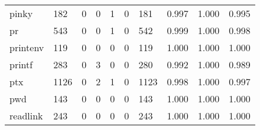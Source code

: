 \begin{longtable}{lp{1.3cm}p{1.3cm}p{1.3cm}p{1.3cm}p{1.3cm}p{1.3cm}p{1.3cm}p{1.3cm}p{1.3cm}}
pinky     &                    182 &                                  0 &                                 0 &                                1 &                                 0 &                             181 &                                   0.997 &                                  1.000 &                                0.995 \\
pr        &                    543 &                                  0 &                                 0 &                                1 &                                 0 &                             542 &                                   0.999 &                                  1.000 &                                0.998 \\
printenv  &                    119 &                                  0 &                                 0 &                                0 &                                 0 &                             119 &                                   1.000 &                                  1.000 &                                1.000 \\
printf    &                    283 &                                  0 &                                 3 &                                0 &                                 0 &                             280 &                                   0.992 &                                  1.000 &                                0.989 \\
ptx       &                   1126 &                                  0 &                                 2 &                                1 &                                 0 &                            1123 &                                   0.998 &                                  1.000 &                                0.997 \\
pwd       &                    143 &                                  0 &                                 0 &                                0 &                                 0 &                             143 &                                   1.000 &                                  1.000 &                                1.000 \\
readlink  &                    243 &                                  0 &                                 0 &                                0 &                                 0 &                             243 &                                   1.000 &                                  1.000 &                                1.000 \\

\end{longtable}
